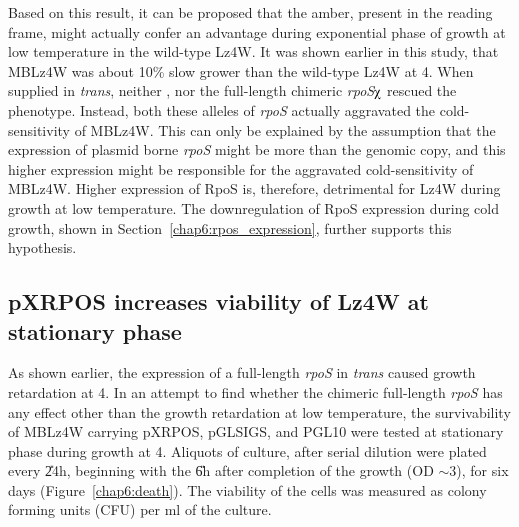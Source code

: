 Based on this result, it can be proposed that the amber, present
in the \lzsig{} reading frame, might actually confer an advantage
during exponential phase of growth at low temperature in the
wild-type Lz4W. It was shown earlier in this study, that MBLz4W
was about 10\% slow grower than the wild-type Lz4W at 4\dg{}. When
supplied in \emph{trans}, neither \lzsig{}, nor the full-length
chimeric \emph{rpoS}$\chiup$ rescued the phenotype. Instead, both
these alleles of \emph{rpoS} actually aggravated the
cold-sensitivity of MBLz4W. This can only be explained by the
assumption that the expression of plasmid borne \emph{rpoS} might
be more than the genomic copy, and this higher expression might be
responsible for the aggravated cold-sensitivity of MBLz4W. Higher
expression of RpoS is, therefore, detrimental for Lz4W during
growth at low temperature. The downregulation of RpoS expression
during cold growth, shown in Section~\ref{chap6:rpos_expression},
further supports this hypothesis.

\subsection{pXRPOS increases viability of Lz4W at stationary phase}

As shown earlier, the expression of a full-length \emph{rpoS} in
\emph{trans} caused growth retardation at 4\dg{}. In an attempt to
find whether the chimeric full-length \emph{rpoS} has any effect
other than the growth retardation at low temperature, the
survivability of MBLz4W carrying pXRPOS, pGLSIGS, and PGL10 were
tested at stationary phase during growth at 4\dg{}. Aliquots of
culture, after serial dilution were plated every \U{24}{h},
beginning with the \U{6}{h} after completion of the growth
(OD $\sim$3), for six days (Figure~\ref{chap6:death}).
The viability of the cells was measured as colony forming units
(CFU) per ml of the culture.

